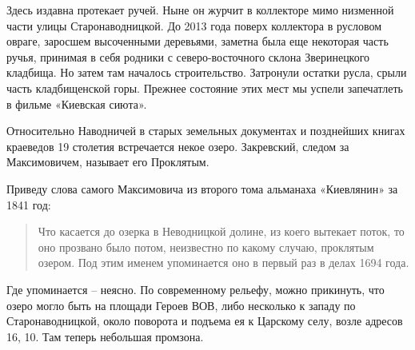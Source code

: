 Здесь издавна протекает ручей. Ныне он журчит в коллекторе мимо низменной части улицы Старонаводницкой. До 2013 года поверх коллектора в русловом овраге, заросшем высоченными деревьями, заметна была еще некоторая часть ручья, принимая в себя родники с северо-восточного склона Зверинецкого кладбища.  Но затем там началось строительство. Затронули остатки русла, срыли часть кладбищенской горы. Прежнее состояние этих мест мы успели запечатлеть в фильме «Киевская сиюта».

Относительно Наводничей в старых земельных документах и позднейших книгах краеведов 19 столетия встречается некое озеро. Закревский, следом за Максимовичем, называет его Проклятым.

Приведу слова самого Максимовича из второго тома альманаха «Киевлянин» за 1841 год:

\begin{quotation}
Что касается до озерка в Неводницкой долине, из коего вытекает поток, то оно прозвано было потом, неизвестно по какому случаю, проклятым озером. Под этим именем упоминается оно в первый раз в делах 1694 года.
\end{quotation}

Где упоминается – неясно. По современному рельефу, можно прикинуть, что озеро могло быть на площади Героев ВОВ, либо несколько к западу по Старонаводницкой, около поворота и подъема ея к Царскому селу, возле адресов 16, 10. Там теперь небольшая промзона.

